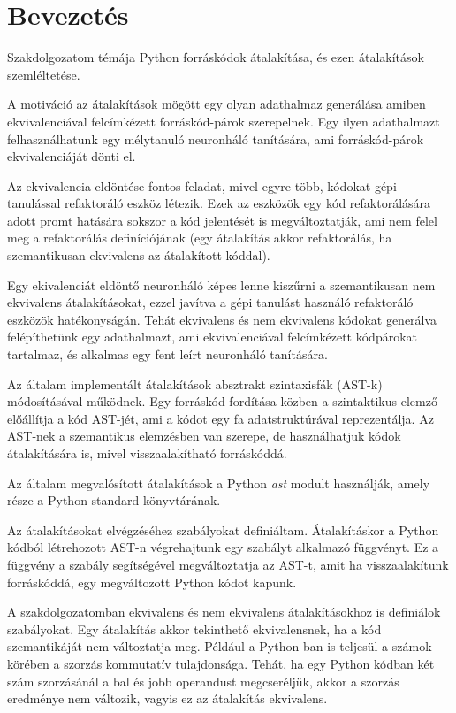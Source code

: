 \chapter{Bevezetés}
\label{ch:intro}


Szakdolgozatom témája Python forráskódok átalakítása, és ezen átalakítások szemléltetése.

A motiváció az átalakítások mögött egy olyan adathalmaz generálása amiben
ekvivalenciával felcímkézett forráskód-párok szerepelnek.
Egy ilyen adathalmazt felhasználhatunk egy mélytanuló
neuronháló tanítására, ami forráskód-párok ekvivalenciáját dönti el.

Az ekvivalencia eldöntése fontos feladat, mivel egyre több, kódokat gépi tanulással refaktoráló eszköz létezik.
Ezek az eszközök egy kód refaktorálására adott promt hatására sokszor a kód jelentését is megváltoztatják,
ami nem felel meg a refaktorálás definíciójának
(egy átalakítás akkor refaktorálás, ha szemantikusan ekvivalens az átalakított kóddal).

Egy ekivalenciát eldöntő neuronháló képes lenne kiszűrni a szemantikusan nem ekvivalens átalakításokat,
ezzel javítva a gépi tanulást használó refaktoráló eszközök hatékonyságán.
Tehát ekvivalens és nem ekvivalens kódokat generálva felépíthetünk egy adathalmazt, ami
ekvivalenciával felcímkézett kódpárokat tartalmaz, és alkalmas egy fent leírt neuronháló
tanítására.

Az általam implementált átalakítások absztrakt szintaxisfák (AST-k) módosításával működnek.
Egy forráskód fordítása közben a szintaktikus elemző előállítja a kód AST-jét,
ami a kódot egy fa adatstruktúrával reprezentálja.
Az AST-nek a szemantikus elemzésben van szerepe,
de használhatjuk kódok átalakítására is, mivel visszaalakítható forráskóddá.

Az általam megvalósított átalakítások a Python \emph{ast} modult \cite{pythonAST} használják,
amely része a Python standard könyvtárának.

Az átalakításokat elvégzéséhez szabályokat definiáltam.
Átalakításkor a Python kódból létrehozott AST-n végrehajtunk egy szabályt alkalmazó függvényt.
Ez a függvény a szabály segítségével megváltoztatja az AST-t, amit ha visszaalakítunk forráskóddá,
egy megváltozott Python kódot kapunk.

A szakdolgozatomban ekvivalens és nem ekvivalens átalakításokhoz is definiálok szabályokat.
Egy átalakítás akkor tekinthető ekvivalensnek, ha a kód szemantikáját nem változtatja meg.
Például a Python-ban is teljesül a számok körében a szorzás kommutatív tulajdonsága.
Tehát, ha egy Python kódban két szám szorzásánál a bal és jobb operandust megcseréljük,
akkor a szorzás eredménye nem változik, vagyis ez az átalakítás ekvivalens.

